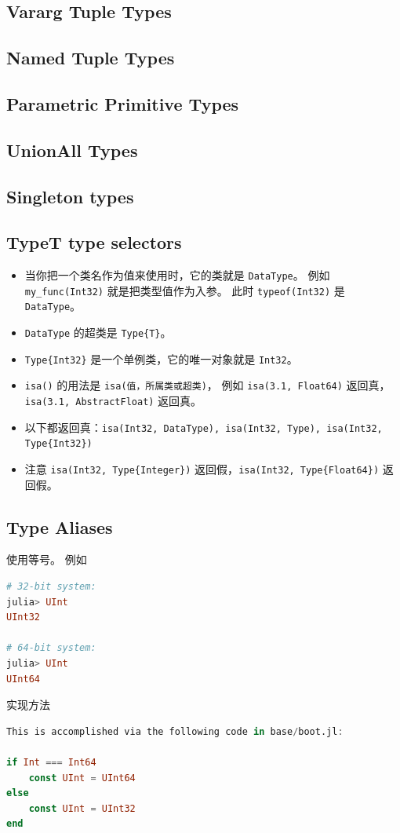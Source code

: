 \subsection{Vararg Tuple Types}

\subsection{Named Tuple Types}

\subsection{Parametric Primitive Types}

\subsection{UnionAll Types}

\subsection{Singleton types}

\subsection{Type{T} type selectors}
\begin{itemize}
\item 当你把一个类名作为值来使用时，它的类就是 \verb`DataType`。 例如 \verb`my_func(Int32)` 就是把类型值作为入参。 此时 \verb`typeof(Int32)` 是 \verb`DataType`。
\item \verb`DataType` 的超类是 \verb`Type{T}`。
\item \verb`Type{Int32}` 是一个单例类，它的唯一对象就是 \verb`Int32`。
\item \verb`isa()` 的用法是 \verb`isa(值，所属类或超类)`， 例如 \verb`isa(3.1, Float64)` 返回真，\verb`isa(3.1, AbstractFloat)` 返回真。
\item 以下都返回真：\verb`isa(Int32, DataType), isa(Int32, Type), isa(Int32, Type{Int32})` 
\item 注意 \verb`isa(Int32, Type{Integer})` 返回假，\verb`isa(Int32, Type{Float64})` 返回假。
\end{itemize}

\subsection{Type Aliases}
使用等号。 例如
\begin{lstlisting}[language=julia]
# 32-bit system:
julia> UInt
UInt32

# 64-bit system:
julia> UInt
UInt64
\end{lstlisting}
实现方法
\begin{lstlisting}[language=julia]
This is accomplished via the following code in base/boot.jl:

if Int === Int64
    const UInt = UInt64
else
    const UInt = UInt32
end
\end{lstlisting}

